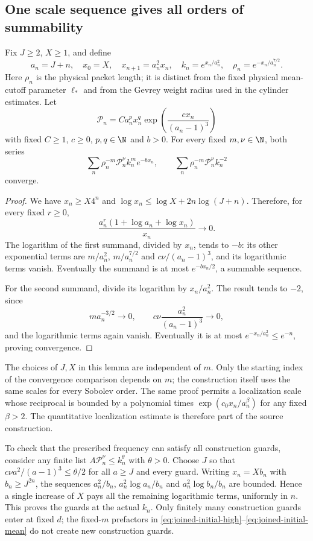 \subsection{One scale sequence gives all orders of summability}
\begin{lemma}\label{lem:initial-scalar-sum}
Fix $J\ge2$, $X\ge1$, and define
\[
 a_n=J+n,\quad x_0=X,\quad x_{n+1}=a_n^2x_n,
 \quad k_n=e^{x_n/a_n^2},\quad \rho_n=e^{-x_n/a_n^{7/2}}.
\]
Here $\rho_n$ is the physical packet length; it is distinct from the
fixed physical mean-cutoff parameter $\ell_*$ and from the Gevrey
weight radius used in the cylinder estimates. Let
\[
 \mathcal P_n=C a_n^p x_n^q
           \exp\left(\frac{c x_n}{(a_n-1)^3}\right)
\]
with fixed $C\ge1$, $c\ge0$, $p,q\in\N$ and $b>0$. For every fixed
$m,\nu\in\N$, both series
\[
 \sum_n\rho_n^{-m}\mathcal P_n^\nu k_n^m e^{-b x_n},
 \qquad
 \sum_n\rho_n^{-m}\mathcal P_n^\nu k_n^{-2}
\]
converge.
\end{lemma}
\begin{proof}
We have $x_n\ge X4^n$ and
$\log x_n\le\log X+2n\log(J+n)$. Therefore, for every fixed $r\ge0$,
\[
 \frac{a_n^r(1+\log a_n+\log x_n)}{x_n}\longrightarrow0.
\]
The logarithm of the first summand, divided by $x_n$, tends to $-b$:
its other exponential terms are $m/a_n^2$, $m/a_n^{7/2}$ and
$c\nu/(a_n-1)^3$, and its logarithmic terms vanish. Eventually the summand
is at most $e^{-b x_n/2}$, a summable sequence.

For the second summand, divide its logarithm by $x_n/a_n^2$. The result
tends to $-2$, since
\[
 ma_n^{-3/2}\to0,\qquad
 c\nu\frac{a_n^2}{(a_n-1)^3}\to0,
\]
and the logarithmic terms again vanish. Eventually it is at most
$e^{-x_n/a_n^2}\le e^{-n}$, proving convergence.
\end{proof}

The choices of $J,X$ in this lemma are independent of $m$. Only the
starting index of the convergence comparison depends on $m$; the
construction itself uses the same scales for every Sobolev order.
The same proof permits a localization scale whose reciprocal is bounded
by a polynomial times $\exp(c_0x_n/a_n^\beta)$ for any fixed $\beta>2$.
The quantitative localization estimate is therefore part of the
source construction.

To check that the prescribed frequency can satisfy all construction
guards, consider any finite list $A\mathcal P_n^\nu\le k_n^\theta$ with
$\theta>0$. Choose $J$ so that
$c\nu a^2/(a-1)^3\le\theta/2$ for all $a\ge J$ and every guard.
Writing $x_n=Xb_n$ with $b_n\ge J^{2n}$, the sequences
$a_n^2/b_n$, $a_n^2\log a_n/b_n$ and $a_n^2\log b_n/b_n$ are bounded.
Hence a single increase of $X$ pays all the remaining logarithmic terms,
uniformly in $n$. This proves the guards at the actual $k_n$.
Only finitely many construction guards enter at fixed $d$; the fixed-$m$
prefactors in \eqref{eq:joined-initial-high}--\eqref{eq:joined-initial-mean}
do not create new construction guards.

